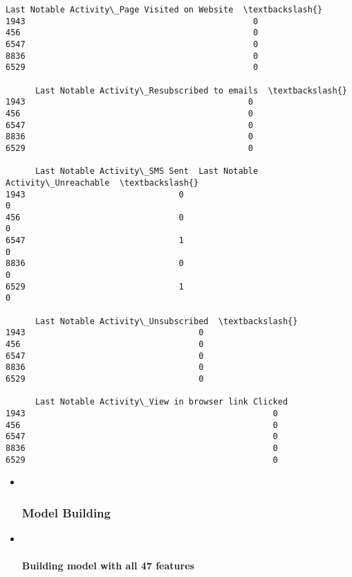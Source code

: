 \documentclass[11pt]{article}
\begin{document}
\begin{tcolorbox}[breakable, size=fbox, boxrule=.5pt, pad at break*=1mm, opacityfill=0]
\begin{Verbatim}[commandchars=\\\{\}]
      Last Notable Activity\_Page Visited on Website  \textbackslash{}
1943                                              0
456                                               0
6547                                              0
8836                                              0
6529                                              0

      Last Notable Activity\_Resubscribed to emails  \textbackslash{}
1943                                             0
456                                              0
6547                                             0
8836                                             0
6529                                             0

      Last Notable Activity\_SMS Sent  Last Notable Activity\_Unreachable  \textbackslash{}
1943                               0                                  0
456                                0                                  0
6547                               1                                  0
8836                               0                                  0
6529                               1                                  0

      Last Notable Activity\_Unsubscribed  \textbackslash{}
1943                                   0
456                                    0
6547                                   0
8836                                   0
6529                                   0

      Last Notable Activity\_View in browser link Clicked
1943                                                  0
456                                                   0
6547                                                  0
8836                                                  0
6529                                                  0
\end{Verbatim}
\end{tcolorbox}
        
    \begin{itemize}
\item ~
  \hypertarget{model-building}{%
  \subsubsection{Model Building}\label{model-building}}
\end{itemize}

    \begin{itemize}
\item ~
  \hypertarget{building-model-with-all-47-features}{%
  \paragraph{Building model with all 47
  features}\label{building-model-with-all-47-features}}
\end{itemize}
\end{document}
